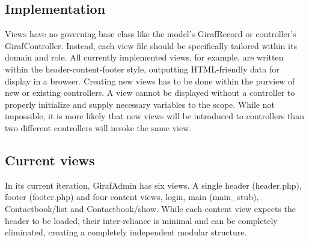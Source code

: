 \subsection{Implementation}
Views have no governing base class like the model's GirafRecord or controller's GirafController. Instead, each view file should be specifically tailored within its domain and role. All currently implemented views, for example, are written within the header-content-footer style, outputting HTML-friendly data for display in a browser.
Creating new views has to be done within the purview of new or existing controllers. A view cannot be displayed without a controller to properly initialize and supply necessary variables to the scope. While not impossible, it is more likely that new views will be introduced to controllers than two different controllers will invoke the same view.

\subsection{Current views}
In its current iteration, GirafAdmin has six views. A single header (header.php), footer (footer.php) and four content views, login, main (main\_stub), Contactbook/list and Contactbook/show. While each content view expects the header to be loaded, their inter-reliance is minimal and can be completely eliminated, creating a completely independent modular structure.